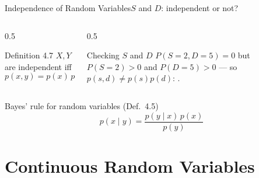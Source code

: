 \documentclass[aspectratio=169,11pt]{beamer}
\begin{document}
\begin{frame}{Independence of Random Variables}{$S$ and $D$: independent or not?}
  \begin{columns}[T]
    \begin{column}{0.5\textwidth}
      \begin{block}{Definition 4.7}
        \small $X, Y$ are independent iff
        \[ p(x,y) = p(x)\,p(y) \quad \forall x,y \]
      \end{block}
    \end{column}
    \begin{column}{0.5\textwidth}
      \begin{exampleblock}{Checking $S$ and $D$}
        \small $P(S=2, D=5)=0$ but $P(S=2)>0$ and $P(D=5)>0$ — so
        $p(s,d)\ne p(s)p(d)$: .
      \end{exampleblock}
    \end{column}
  \end{columns}
  \vfill
  \begin{block}{Bayes' rule for random variables (Def.\ 4.5)}
    \small \[ p(x\mid y) = \frac{p(y\mid x)\,p(x)}{p(y)} \]
  \end{block}
\end{frame}

\section{Continuous Random Variables}
\end{document}
